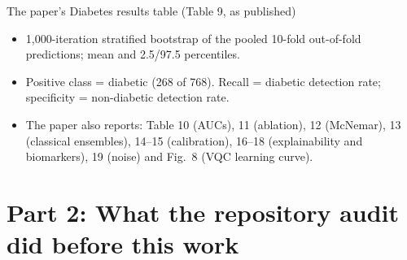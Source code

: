 \documentclass[aspectratio=169,10pt,t,xcolor={table}]{beamer}
\newcommand{\tabdir}{../reimplementation/tex/slides/}
\begin{document}
\begin{frame}{The paper's Diabetes results table (Table 9, as published)}
\begin{center}
{\scriptsize}
\end{center}
\begin{itemize}\footnotesize
  \item 1,000-iteration stratified bootstrap of the pooled 10-fold out-of-fold predictions; mean and 2.5/97.5 percentiles.
  \item Positive class = diabetic (268 of 768). Recall = diabetic detection rate; specificity = non-diabetic detection rate.
  \item The paper also reports: Table 10 (AUCs), 11 (ablation), 12 (McNemar), 13 (classical ensembles), 14--15 (calibration), 16--18 (explainability and biomarkers), 19 (noise) and Fig.~8 (VQC learning curve).
\end{itemize}
\end{frame}

\section{Part 2: What the repository audit did before this work}
\end{document}
